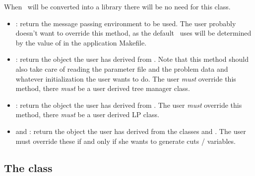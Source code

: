 When \BB\ will be converted into a library there will be no need for this
class. 

\begin{itemize}
\item {}: return the message passing environment to be used.
  The user probably doesn't want to override this method, as the default 
  \BB\ uses will be determined by the value of  in the
  application Makefile.
\item {}: return the object the user has derived from 
  . Note that this method should also take care of reading
  the parameter file and the problem data and whatever initialization the user
  wants to do. The user {\em must} override this method, there {\em must} be a
  user derived tree manager class.
\item {}: return the object the user has derived from 
  . The user {\em must} override this method, there 
  {\em must} be a user derived LP class.
\item {} and : return the object the user has
  derived 
  from the classes  and . The user
  must override these if and only if she wants to generate cuts / variables.
\end{itemize}

\subsection{The  class}

